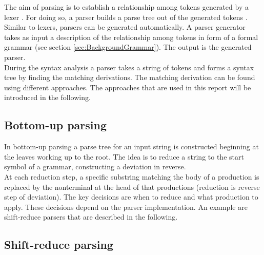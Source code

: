 The aim of parsing is to establish a relationship among tokens generated by a lexer \cite{LexYacc.1992}. For doing so, a parser builds a parse tree out of the generated tokens \cite{Mogensen.2017}.\\
Similar to lexers, parsers can be generated automatically.
A parser generator takes as input a description of the relationship among tokens in form of a formal grammar (see section \ref{sec:BackgroundGrammar}). The output is the generated parser. \cite{LexYacc.1992}\\
During the syntax analysis a parser takes a string of tokens and forms a syntax tree by finding the matching derivations. The matching derivation can be found using different approaches. The approaches that are used in this report will be introduced in the following.

\subsection{Bottom-up parsing}\label{sec:BackgroundParserBottomUp}

In bottom-up parsing a parse tree for an input string is constructed beginning at the leaves working up to the root. The idea is to reduce a string to the start symbol of a grammar, constructing a deviation in reverse.
\cite{Aho.2007}\\
At each reduction step, a specific substring matching the body of a production is replaced by the nonterminal at the head of that productions (reduction is reverse step of deviation).
The key decisions are when to reduce and what production to apply.
These decisions depend on the parser implementation.
An example are shift-reduce parsers that are described in the following.

\subsection{Shift-reduce parsing}\label{sec:BackgroundParserShiftReduce}

